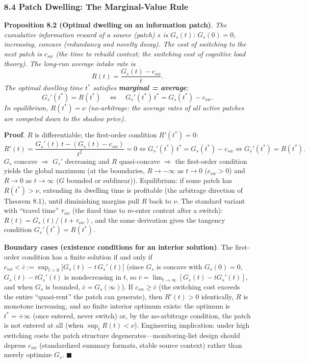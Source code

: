 \documentclass[
  11pt]{article}
\begin{document}
\subsubsection{8.4 Patch Dwelling: The Marginal-Value
Rule}\label{patch-dwelling-the-marginal-value-rule}

\textbf{Proposition 8.2 (Optimal dwelling on an information patch)}.
\emph{The cumulative information reward of a source (patch) \(s\) is
\(G_s(t)\): \(G_s(0) = 0\), increasing, concave (redundancy and novelty
decay). The cost of switching to the next patch is \(c_{sw}\) (the time
to rebuild context; the switching cost of cognitive load theory). The
long-run average intake rate is} \[R(t) = \frac{G_s(t) - c_{sw}}{t}.\]
\emph{The optimal dwelling time \(t^*\) satisfies \textbf{marginal =
average}:}
\[G_s'(t^*) = R(t^*) \quad\Longleftrightarrow\quad G_s'(t^*)\, t^* = G_s(t^*) - c_{sw}.\]
\emph{In equilibrium, \(R(t^*) = \nu\) (no-arbitrage: the average rates
of all active patches are competed down to the shadow price).}

\textbf{Proof}. \(R\) is differentiable; the first-order condition
\(R'(t^*) = 0\):
\[R'(t) = \frac{G_s'(t)\,t - (G_s(t) - c_{sw})}{t^2} = 0 \iff G_s'(t^*)\,t^* = G_s(t^*) - c_{sw} \iff G_s'(t^*) = R(t^*).\]
\(G_s\) concave \(\Rightarrow\) \(G_s'\) decreasing and \(R\)
quasi-concave \(\Rightarrow\) the first-order condition yields the
global maximum (at the boundaries, \(R \to -\infty\) as \(t \to 0\)
(\(c_{sw}>0\)) and \(R \to 0\) as \(t \to \infty\) (\(G\) bounded or
sublinear)). Equilibrium: if some patch has \(R(t^*) > \nu\), extending
its dwelling time is profitable (the arbitrage direction of Theorem
8.1), until diminishing margins pull \(R\) back to \(\nu\). The standard
variant with ``travel time'' \(\tau_{sw}\) (the fixed time to re-enter
context after a switch): \(R(t) = G_s(t)/(t + \tau_{sw})\), and the same
derivation gives the tangency condition \(G_s'(t^*) = R(t^*)\).

\textbf{Boundary cases (existence conditions for an interior solution)}.
The first-order condition has a finite solution if and only if
\(c_{sw} < \bar c := \sup_{t>0}\big[G_s(t) - t\,G_s'(t)\big]\) (since
\(G_s\) is concave with \(G_s(0)=0\), \(G_s(t) - tG_s'(t)\) is
nondecreasing in \(t\), so
\(\bar c = \lim_{t\to\infty}[G_s(t) - tG_s'(t)]\), and when \(G_s\) is
bounded, \(\bar c = G_s(\infty)\)). If \(c_{sw} \ge \bar c\) (the
switching cost exceeds the entire ``quasi-rent'' the patch can
generate), then \(R'(t) > 0\) identically, \(R\) is monotone increasing,
and no finite interior optimum exists: the optimum is \(t^* = +\infty\)
(once entered, never switch) or, by the no-arbitrage condition, the
patch is not entered at all (when \(\sup_t R(t) < \nu\)). Engineering
implication: under high switching costs the patch structure
degenerates---monitoring-list design should depress \(c_{sw}\)
(standardized summary formats, stable source context) rather than merely
optimize \(G_s\). \(\blacksquare\)
\end{document}
